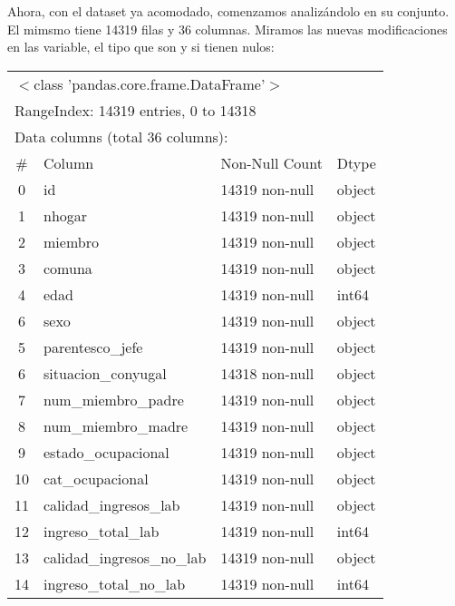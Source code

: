 \documentclass[a4paper]{article}
\begin{document}
    Ahora, con el dataset ya acomodado, comenzamos analizándolo en su conjunto. El mimsmo tiene 14319 filas y 36 columnas. Miramos las nuevas modificaciones en las variable, el tipo que son y si tienen nulos:
    \begin{table}[H]\begin{center}
    \begin{tabular}{clll}
        \multicolumn{4}{l}{$<$class 'pandas.core.frame.DataFrame'$>$} \\
        \multicolumn{4}{l}{RangeIndex: 14319 entries, 0 to 14318} \\
        \multicolumn{4}{l}{Data columns (total 36 columns):} \\
        \#  & Column                     & Non-Null Count & Dtype \\ \hline
        0 & id                           & 14319 non-null & object \\
        1 & nhogar                       & 14319 non-null & object \\
        2 &  miembro                     & 14319 non-null & object \\ 
        3 &  comuna                      & 14319 non-null & object  \\
        4 &  edad                        & 14319 non-null & int64   \\
        6 &  sexo                        & 14319 non-null & object \\
        5 &  parentesco\_jefe             & 14319 non-null & object  \\
        6 &  situacion\_conyugal          & 14318 non-null & object  \\
        7 &  num\_miembro\_padre           & 14319 non-null & object  \\
        8 &  num\_miembro\_madre           & 14319 non-null & object  \\
        9 &  estado\_ocupacional          & 14319 non-null & object  \\
        10 &  cat\_ocupacional            & 14319 non-null & object  \\
        11 & calidad\_ingresos\_lab        & 14319 non-null & object  \\
        12 & ingreso\_total\_lab           & 14319 non-null & int64   \\
        13 & calidad\_ingresos\_no\_lab     & 14319 non-null & object  \\
        14 & ingreso\_total\_no\_lab        & 14319 non-null & int64   \\

\end{tabular}
\end{center}
\end{table}
\end{document}

